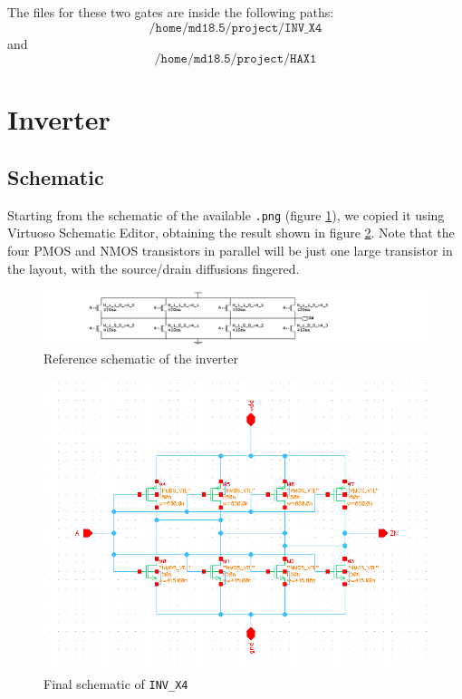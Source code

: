\documentclass[a4paper]{article}
\newcommand{\inv}{\texttt{INV\_X4}\xspace}
\begin{document}
The files for these two gates are inside the following paths:
\begin{equation*}
	\texttt{/home/md18.5/project/INV\_X4}
\end{equation*}
and
\begin{equation*}
	\texttt{/home/md18.5/project/HAX1}
\end{equation*}

\section{Inverter}
\subsection{Schematic}
Starting from the schematic of the available \texttt{.png} (figure \ref{fig:inv_png}), we copied it using Virtuoso Schematic Editor, obtaining the result shown in figure \ref{fig:inv_schematic}. Note that the four PMOS and NMOS transistors in parallel will be just one large transistor in the layout, with the source/drain diffusions fingered.
\begin{figure}[H]
	\centering
	\includegraphics[width=1.2\linewidth]{../INV_X4/INV_X4.png}
	\caption{Reference schematic of the inverter}
	\label{fig:inv_png}
\end{figure}
\begin{figure}[H]
	\centering
	\includegraphics[width=\linewidth]{../INV_X4/INV_X4_schematic.png}
	\caption{Final schematic of \inv}
	\label{fig:inv_schematic}
\end{figure}
\end{document}
